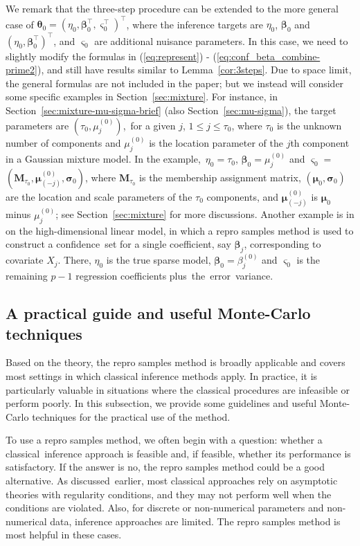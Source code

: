 \documentclass[12pt]{article}
\theoremstyle{shortspace}
\def\*#1{\bm{#1}}
\begin{document}
We remark that the three-step procedure can be extended to the more general case of $\*\theta_0 = (\eta_0, \*\beta_0^\top, \*\varsigma_0^\top)^\top$, where the inference targets are $\eta_0$, $\*\beta_0$ and $(\eta_0, \*\beta_0^\top)^\top$, and $\*\varsigma_0$ are additional nuisance parameters.   In this case, we need to slightly modify the formulas in (\ref{eq:represent}) - (\ref{eq:conf_beta_combine-prime2}), and still have results similar to Lemma~\ref{cor:3steps}. 
Due to space limit, the general formulas are not included in the paper; but we instead will consider some specific examples in Section~\ref{sec:mixture}.  
For instance, in Section~\ref{sec:mixture-mu-sigma-brief} (also Section~\ref{sec:mu-sigma}), 
the target parameters are 
$(\tau_0, \mu_{j}^{(0)})$,~for a 
given $j$, $1 \leq j \leq \tau_0$,  where $\tau_0$ is the 
unknown number of components and $\mu_j^{(0)}$ is the location parameter of the $j$th component in a Gaussian mixture model. In the example,~$\eta_0 = \tau_0$, $\*\beta_0 = \mu_{j}^{(0)}$ and $ \*\varsigma_0 =$ $ (\*M_{\tau_0}, \*\mu_{(-j)}^{(0)}, \*\sigma_0)$,  where  
$\*M_{\tau_0}$ is the membership assignment matrix, $(\*\mu_0, \*\sigma_0)$ are the location and scale parameters of the $\tau_0$ components, 
and
$\*\mu_{(-j)}^{(0)}$ is $\*\mu_0$ minus $\mu_{j}^{(0)}$; see Section~\ref{sec:mixture} for more discussions. 
Another example is in \cite{wang2022highdimenional} on the high-dimensional linear model,  in which a repro samples method is used to construct a confidence~set for a single coefficient, say $\*\beta_j$, corresponding to covariate $X_j$. There, $\eta_0$ is the true sparse model, $\*\beta_0 = \beta_{j}^{(0)}$ and $\*\varsigma_0$ is the remaining $p-1$ regression coefficients plus~the~error~variance. 



\subsection{A practical guide and useful Monte-Carlo techniques}\label{sec:guide}

Based on the theory, the repro samples method is broadly applicable and covers most settings in which classical inference methods apply. In practice, it is particularly valuable in situations where the classical procedures are infeasible or perform poorly. In this subsection, we provide some guidelines and useful Monte-Carlo techniques for the practical use of the method.

To use a repro samples method, we often begin with a question: whether a classical~inference approach is feasible and, if feasible, whether its performance  is satisfactory.
If the answer is no,  the repro samples method could be a good alternative. As discussed~earlier, most classical approaches rely on asymptotic theories with regularity conditions, and they may not perform well when the conditions are violated. Also, for discrete or non-numerical parameters and non-numerical data, inference approaches are limited. The repro samples method is most helpful in these cases. 
\end{document}
